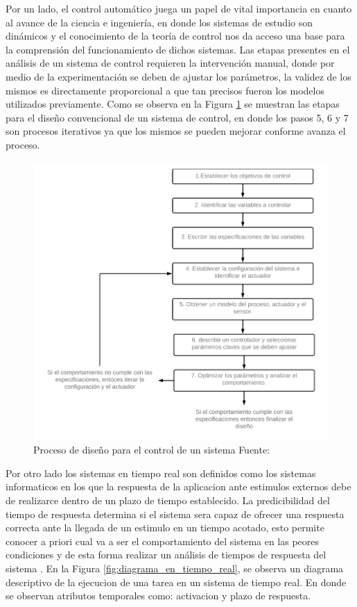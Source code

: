 \documentclass[12pt]{article}
\begin{document}

Por un lado, el control automático juega un papel de vital importancia en cuanto al avance de la ciencia e ingeniería, en donde los sistemas de estudio son dinámicos y el conocimiento de la teoría de control nos da acceso una base para la comprensión del funcionamiento de dichos sistemas. Las etapas presentes en el análisis de un sistema de control requieren la intervención manual, donde por medio de la experimentación se deben de ajustar los parámetros, la validez de los mismos es directamente proporcional a que tan precisos fueron los modelos utilizados previamente. Como se observa en la Figura \ref{fig:diagrama_control} se muestran las etapas para el diseño convencional de un sistema de control, en donde los pasos 5, 6 y 7 son procesos iterativos ya que los mismos se pueden mejorar conforme avanza el proceso. 


\begin{figure}[h!]
  \centering
  \includegraphics[scale=0.5]{diagramas/diagrama_control.png}
  \caption{Proceso de diseño para el control de un sistema Fuente: \cite{4}}
  \label{fig:diagrama_control}
\end{figure}


Por otro lado los sistemas en tiempo real son definidos como los sistemas informaticos en los que la respuesta de la aplicacion ante estimulos externos debe de realizarce dentro de un plazo de tiempo establecido. La predicibilidad del tiempo de respuesta determina si el sistema sera capaz de ofrecer una respuesta correcta ante la llegada de un estimulo en un tiempo acotado, esto permite conocer a priori cual va a ser el comportamiento del sistema en las peores condiciones y de esta forma realizar un análisis de tiempos de respuesta del sistema \cite{alonso2010panoramica}. En la Figura \ref{fig:diagrama_en_tiempo_real}, se observa un diagrama descriptivo de la ejecucion de una tarea en un sistema de tiempo real. En donde se observan atributos temporales como: activacion y plazo de respuesta\cite{de2000introduccion}. 
\end{document}
